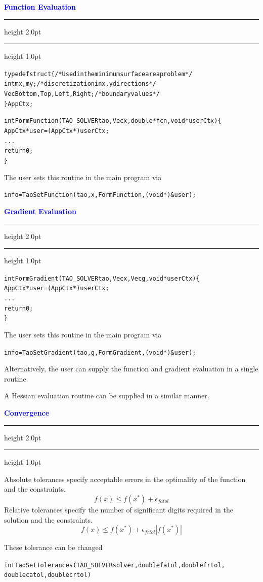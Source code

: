 \documentclass{seminar}
\newcommand{\redstripe}{\textcolor{BrickRed}{\hrule height 2.0pt\hfil}
             \vspace{-1.8pt}
             \textcolor{BrickRed}{\hrule height 1.0pt\hfil}
}
\newcommand{\heading}[1]{%
   \vspace*{0.5pt}%
   \centerline{\textcolor{Blue}{\textbf{#1}}}%
   \redstripe
}
\begin{document}
\begin{slide}

\heading{Function Evaluation}

\begin{alltt}
\scriptsize \setlength{\baselineskip}{10pt}
  typedef struct \{         /* Used in the minimum surface area problem */
    int         mx, my;            /* discretization in x, y directions */
    Vec         Bottom, Top, Left, Right;            /* boundary values */
  \} AppCtx;

  int FormFunction(TAO_SOLVER tao, Vec x, double* fcn,void *userCtx)\{
     AppCtx *user = (AppCtx *)userCtx;
     ...
     return 0;
  \}
\end{alltt}
The user sets this routine in the main program via
\begin{alltt}
\scriptsize \setlength{\baselineskip}{10pt}
    info = TaoSetFunction(tao,x,FormFunction,(void *)&user);
\end{alltt}

\vfill

\end{slide}

\begin{slide}

\heading{Gradient Evaluation}

\begin{alltt}
\scriptsize \setlength{\baselineskip}{10pt}
  int FormGradient(TAO_SOLVER tao, Vec x, Vec g,void *userCtx)\{
     AppCtx *user = (AppCtx *)userCtx;
     ...
     return 0;
\}
\end{alltt}

The user sets this routine in the main program via
\begin{alltt}
\scriptsize \setlength{\baselineskip}{10pt}
    info = TaoSetGradient(tao,g,FormGradient,(void *)&user);
\end{alltt}
Alternatively, the user can supply the function and gradient evaluation
in a single routine.

\medskip

A Hessian evaluation routine can be supplied in a similar manner.

\vfill

\end{slide}

\begin{slide}

\heading{Convergence}

Absolute tolerances specify acceptable errors in the optimality of the function
and the constraints.
\[ f(x) \leq f(x^*) + \epsilon_{fatol} \]
Relative tolerances specify the number of significant digits required
in the solution and the constraints.
\[ 
f(x) \leq f(x^*) + \epsilon_{frtol} | f(x^*) |
\]

These tolerance can be changed
\begin{alltt}
\scriptsize \setlength{\baselineskip}{10pt}
    int TaoSetTolerances(TAO_SOLVER solver,double fatol,double frtol,
                                           double catol,double crtol)
\end{alltt}

\vfill

\end{slide}
\end{document}
